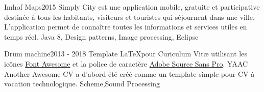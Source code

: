 %
%
%


\begin{projects}
	\project
	{Imhof Maps}{2015}
		{}
	{Simply City est une application mobile, gratuite et participative destinée à tous les habitants, visiteurs et touristes qui séjournent dans une ville. L’application permet de connaître toutes les informations et services utiles en temps réel.}
	{Java 8, Design patterns, Image processing, Eclipse}
				
	\project
	{Drum machine}{2013 - 2018}
	{}
	{Template \LaTeX pour Curiculum Vitæ utilisant les icônes \href{https://fontawesome.com}{Font Awesome} et la police de caractère \href{https://fonts.google.com/specimen/Source+Sans+Pro}{Adobe Source Sans Pro}. YAAC Another Awesome CV a d'abord été créé comme un template simple pour CV à vocation technologique.}
	{Scheme,Sound Processing}

\end{projects}
